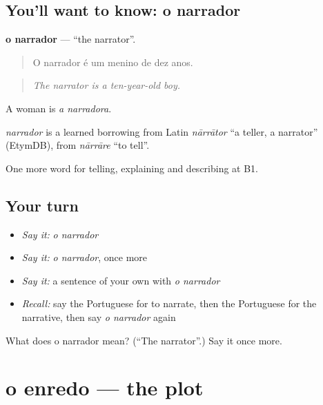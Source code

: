 \subsection*{You'll want to know: o narrador}
\textbf{o narrador} — \textquotedblleft{}the narrator\textquotedblright{}.

\begin{quote}
O narrador é um menino de dez anos.
\end{quote}

\begin{quote}
\emph{The narrator is a ten-year-old boy.}
\end{quote}

A woman is \emph{a narradora}.

\begin{cousinweb}
\emph{narrador} is a learned borrowing from Latin \emph{nārrātor} \textquotedblleft{}a teller, a narrator\textquotedblright{} (EtymDB), from \emph{nārrāre} \textquotedblleft{}to tell\textquotedblright{}.
\end{cousinweb}

\begin{grammarlens}[title={What you've built}]
One more word for telling, explaining and describing at B1.
\end{grammarlens}

\subsection*{Your turn}
\begin{itemize}
\raggedright
  \item \emph{Say it:} \emph{o narrador}
  \item \emph{Say it:} \emph{o narrador}, once more
  \item \emph{Say it:} a sentence of your own with \emph{o narrador}
  \item \emph{Recall:} say the Portuguese for to narrate, then the Portuguese for the narrative, then say \emph{o narrador} again
\end{itemize}

\begin{tcolorbox}[breakable,colback=teal!4,colframe=teal!35!black,title={Before you move on}]
What does o narrador mean? (\textquotedblleft{}The narrator\textquotedblright{}.) Say it once more.
\end{tcolorbox}
\section[o enredo]{o enredo — the plot}

